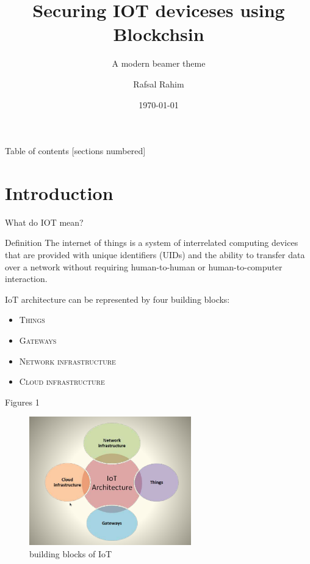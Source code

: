 \documentclass[10pt]{beamer}
\title{Securing IOT deviceses using Blockchsin}
\subtitle{A modern beamer theme}
\date{\today}
\author{Rafsal Rahim}
\institute{Dept. MCA, College of Engineering Trivandrum}
\begin{document}
\maketitle

\begin{frame}{Table of contents}
  [sections numbered]
  \tableofcontents[hideallsubsections]
\end{frame}

\section{Introduction}

\begin{frame}[fragile]{What do IOT  mean?}
      \begin{block}{Definition}
	The internet of things is a system of interrelated computing devices that are provided with unique identifiers (UIDs) and the ability to transfer data over a network without requiring human-to-human or human-to-computer interaction.
	\end{block}
	IoT architecture can be represented by four building blocks:
	\begin{itemize}
		\item \textsc{Things}
		\item \textsc{Gateways}
		\item \textsc{Network infrastructure}
		\item \textsc{Cloud infrastructure}
	\end{itemize}




\end{frame}

\begin{frame}{Figures 1}
  \begin{figure}  
	\includegraphics[width=7cm]{iot_struct}    
    \caption{building blocks of IoT}  \end{figure}
\end{frame}
\end{document}
